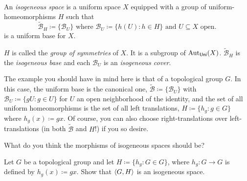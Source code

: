 \begin{dfn}\label{IsogeneousSpace}
An \emph{isogeneous space} is a uniform space $X$ equipped with a group of uniform-homeomorphisms $H$ such that
\begin{equation}\label{5.1.28}
\widetilde{\mathcal{B}}_H\coloneqq \{ \mathcal{B}_U\} \text{ where }\mathcal{B}_U\coloneqq \{ h(U):h\in H\} \text{ and }U\subseteq X\text{ open}.
\end{equation}
is a uniform base for $X$.
\begin{rmk}
$H$ is called the \emph{group of symmetries} of $X$.  It is a subgroup of $\operatorname{Aut} _{\mathsf{Uni}}(X)$.  $\widetilde{\mathcal{B}}_H$ is the \emph{isogeneous base} and each $\mathcal{B}_U$ is an \emph{isogeneous cover}.
\end{rmk}
\begin{rmk}
The example you should have in mind here is that of a topological group $G$.  In this case, the uniform base is the canonical one, $\widetilde{\mathcal{B}}\coloneqq \{ \mathcal{B}_U\}$ with $\mathcal{B}_U\coloneqq \{ gU:g\in U\}$ for $U$ an open neighborhood of the identity, and the set of all uniform homeomorphisms is the set of all left translations, $H\coloneqq \{ h_g:g\in G\}$ where $h_g(x)\coloneqq gx$.  Of course, you can also choose right-translations over left-translations (in both $\widetilde{\mathcal{B}}$ and $H$!) if you so desire.
\end{rmk}
\begin{rmk}
What do you think the morphisms of isogeneous spaces should be?
\end{rmk}
\end{dfn}
\begin{exr}
Let $G$ be a topological group and let $H\coloneqq \{ h_g:G\in G\}$, where $h_g:G\rightarrow G$ is defined by $h_g(x)\coloneqq gx$.  Show that $\langle G,H\rangle$ is an isogeneous space.
\end{exr}

